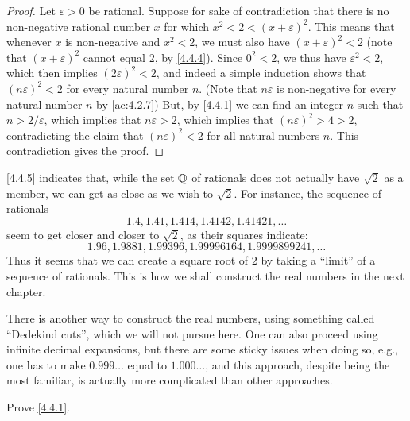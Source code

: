 \begin{proof}
  Let \(\varepsilon > 0\) be rational.
  Suppose for sake of contradiction that there is no non-negative rational number \(x\) for which \(x^2 < 2 < (x + \varepsilon)^2\).
  This means that whenever \(x\) is non-negative and \(x^2 < 2\), we must also have \((x + \varepsilon)^2 < 2\)
  (note that \((x + \varepsilon)^2\) cannot equal \(2\), by \cref{4.4.4}).
  Since \(0^2 < 2\), we thus have \(\varepsilon^2 < 2\), which then implies \((2\varepsilon)^2 < 2\), and indeed a simple induction shows that \((n\varepsilon)^2 < 2\) for every natural number \(n\).
  (Note that \(n\varepsilon\) is non-negative for every natural number \(n\) by \cref{ac:4.2.7})
  But, by \cref{4.4.1} we can find an integer \(n\) such that \(n > 2 / \varepsilon\), which implies that \(n\varepsilon > 2\), which implies that \((n\varepsilon)^2 > 4 > 2\), contradicting the claim that \((n\varepsilon)^2 < 2\) for all natural numbers \(n\).
  This contradiction gives the proof.
\end{proof}

\begin{note}
  \cref{4.4.5} indicates that, while the set \(\mathbb{Q}\) of rationals does not actually have \(\sqrt{2}\) as a member, we can get as close as we wish to \(\sqrt{2}\).
  For instance, the sequence of rationals
  \[
    1.4, 1.41, 1.414, 1.4142, 1.41421, \dots
  \]
  seem to get closer and closer to \(\sqrt{2}\), as their squares indicate:
  \[
    1.96, 1.9881, 1.99396, 1.99996164, 1.9999899241, \dots
  \]
  Thus it seems that we can create a square root of \(2\) by taking a ``limit'' of a sequence of rationals.
  This is how we shall construct the real numbers in the next chapter.
\end{note}

\begin{note}
  There is another way to construct the real numbers, using something called ``Dedekind cuts'', which we will not pursue here.
  One can also proceed using infinite decimal expansions, but there are some sticky issues when doing so, e.g., one has to make \(0.999\dots\) equal to \(1.000\dots\), and this approach, despite being the most familiar, is actually more complicated than other approaches.
\end{note}

\exercisesection

\begin{ex}\label{ex:4.4.1}
  Prove \cref{4.4.1}.
\end{ex}


